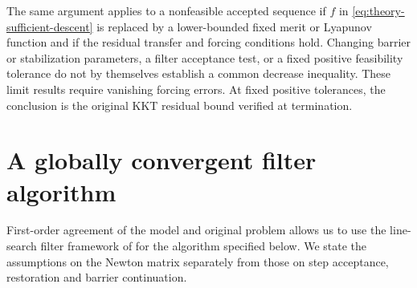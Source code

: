 \documentclass[pdflatex,sn-mathphys-num]{sn-jnl}
\theoremstyle{thmstyleone}
\theoremstyle{thmstylethree}
\newcounter{algorithm}
\begin{document}
The same argument applies to a nonfeasible accepted sequence if $f$ in
\eqref{eq:theory-sufficient-descent} is replaced by a lower-bounded fixed
merit or Lyapunov function and if the residual transfer and forcing
conditions hold. Changing barrier or stabilization parameters, a filter acceptance test,
or a fixed positive
feasibility tolerance do not by themselves establish a common decrease
inequality.
These limit results require vanishing forcing errors. At fixed positive
tolerances, the conclusion is the original KKT residual bound verified at
termination.


\FloatBarrier
\section{A globally convergent filter algorithm}
\label{sec:filtered-realization}
First-order agreement of the model and original problem allows us to use
the line-search filter framework of \citet{WachterBiegler2005Global} for
the algorithm specified below. We state the assumptions on the Newton
matrix separately from those on step acceptance, restoration and barrier
continuation.
\end{document}
